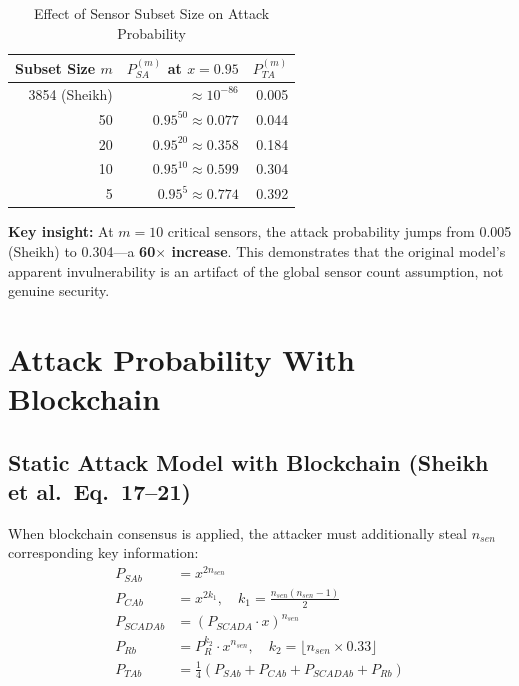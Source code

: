 \documentclass[10pt,twocolumn,letterpaper]{article}
\begin{document}
\begin{table}[htbp]
\caption{Effect of Sensor Subset Size on Attack Probability}
\label{tab:sensor_subsets}
\centering
\scriptsize
\begin{tabular}{@{}rrr@{}}
\toprule
\textbf{Subset Size $m$} & \textbf{$P_{SA}^{(m)}$ at $x=0.95$} & \textbf{$P_{TA}^{(m)}$} \\
\midrule
3854 (Sheikh) & $\approx 10^{-86}$ & 0.005 \\
50  & $0.95^{50} \approx 0.077$ & 0.044 \\
20  & $0.95^{20} \approx 0.358$ & 0.184 \\
10  & $0.95^{10} \approx 0.599$ & 0.304 \\
5   & $0.95^{5}  \approx 0.774$ & 0.392 \\
\bottomrule
\end{tabular}
\end{table}

\textbf{Key insight:} At $m = 10$ critical sensors, the attack probability jumps from 0.005 (Sheikh) to 0.304---a \textbf{60$\times$ increase}. This demonstrates that the original model's apparent invulnerability is an artifact of the global sensor count assumption, not genuine security.

\section{Attack Probability With Blockchain}
\label{sec:with}

\subsection{Static Attack Model with Blockchain (Sheikh et al.\ Eq.~17--21)}

When blockchain consensus is applied, the attacker must additionally steal $n_{sen}$ corresponding key information:
\begin{align}
P_{SAb} &= x^{2n_{sen}} \tag{Eq.~17} \\
P_{CAb} &= x^{2k_1}, \quad k_1 = \frac{n_{sen}(n_{sen}-1)}{2} \tag{Eq.~18} \\
P_{SCADAb} &= (P_{SCADA} \cdot x)^{n_{sen}} \tag{Eq.~19} \\
P_{Rb} &= P_R^{k_2} \cdot x^{n_{sen}}, \quad k_2 = \lfloor n_{sen} \times 0.33 \rfloor \tag{Eq.~20} \\
P_{TAb} &= \frac{1}{4}\left(P_{SAb} + P_{CAb} + P_{SCADAb} + P_{Rb}\right) \tag{Eq.~21}
\end{align}
\end{document}
